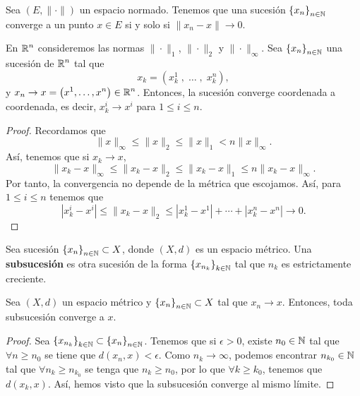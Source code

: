 \begin{observation}
	Sea $\displaystyle \left(E, \| \cdot \| \right) $ un espacio normado. Tenemos que una sucesión $\displaystyle \left\{ x_{n}\right\} _{n\in\mathbb{N}} $ converge a un punto $\displaystyle x \in E $ si y solo si $\displaystyle \| x_{n} - x \| \to 0 $.
\end{observation}
\begin{prop}
	En $\displaystyle \mathbb{R}^{n} $ consideremos las normas $\displaystyle \| \cdot \| _{1} $, $\displaystyle \| \cdot \|_{2} $ y $\displaystyle \| \cdot \|_{\infty} $. Sea $\displaystyle \left\{ x_{n}\right\} _{n\in\mathbb{N}} $ una sucesión de $\displaystyle \mathbb{R}^{n} $ tal que 
	\[x_{k} = \left(x_{k}^{1} \; , \; \ldots \;, \;  x^{n}_{k}\right) ,\]
	y $\displaystyle x_{n} \to x = \left(x^{1}, \ldots, x^{n}\right)\in \mathbb{R}^{n}$. Entonces, la sucesión converge coordenada a coordenada, es decir, $\displaystyle x_{k}^{i} \to x^{i} $ para $\displaystyle 1 \leq i \leq n $.
\end{prop}
\begin{proof}
Recordamos que
\[\| x \|_{\infty} \leq \| x \| _{2} \leq \| x \|_{1} < n\|x\|_{\infty} .\]
Así, tenemos que si $\displaystyle x_{k} \to x $,
\[ \|x_{k}-x\|_{\infty} \leq \|x_{k}-x\|_{2} \leq \|x_{k}-x\|_{1} \leq n\|x_{k}-x\|_{\infty} .\]
Por tanto, la convergencia no depende de la métrica que escojamos. Así, para $\displaystyle 1 \leq i \leq n $ tenemos que
\[ \left|x_{k}^{i}-x^{i}\right| \leq \|x_{k}-x\|_{2} \leq \left|x_{k}^{1}-x^{1}\right|+\cdots + \left|x_{k}^{n}-x^{n}\right| \to 0 .\]
\end{proof}
\begin{definition}[Subsucesión]
	Sea sucesión $\displaystyle \left\{ x_{n}\right\} _{n\in\mathbb{N}} \subset X $, donde $\displaystyle \left(X,d\right) $ es un espacio métrico. Una \textbf{subsucesión} es otra sucesión de la forma $\displaystyle \left\{ x_{n_{k}}\right\} _{k \in \mathbb{N}} $ tal que $\displaystyle n_{k} $ es estrictamente creciente.
\end{definition}
\begin{prop}
	Sea $\displaystyle \left(X,d\right) $ un espacio métrico y $\displaystyle \left\{ x_{n}\right\} _{n\in\mathbb{N}}\subset X $ tal que $\displaystyle x_{n} \to x $. Entonces, toda subsucesión converge a $\displaystyle x $.
\end{prop}
\begin{proof}
	Sea $\displaystyle \left\{ x_{n_{k}}\right\} _{k\in\mathbb{N}} \subset \left\{ x_{n}\right\} _{n\in\mathbb{N}}$. Tenemos que si $\displaystyle \epsilon > 0 $, existe $\displaystyle n_{0} \in \mathbb{N} $ tal que $\displaystyle \forall n \geq n_{0} $ se tiene que $\displaystyle d\left(x_{n}, x\right) < \epsilon  $. Como $\displaystyle n_{k} \to \infty $, podemos encontrar $\displaystyle n_{k_{0}} \in \mathbb{N} $ tal que $\displaystyle \forall n_{k} \geq n_{k_{0}} $ se tenga que $\displaystyle n_{k} \geq n_{0} $, por lo que $\displaystyle \forall k \geq k_{0} $, tenemos que $\displaystyle d\left(x_{k}, x\right) $.
	Así, hemos visto que la subsucesión converge al mismo límite.
\end{proof}

